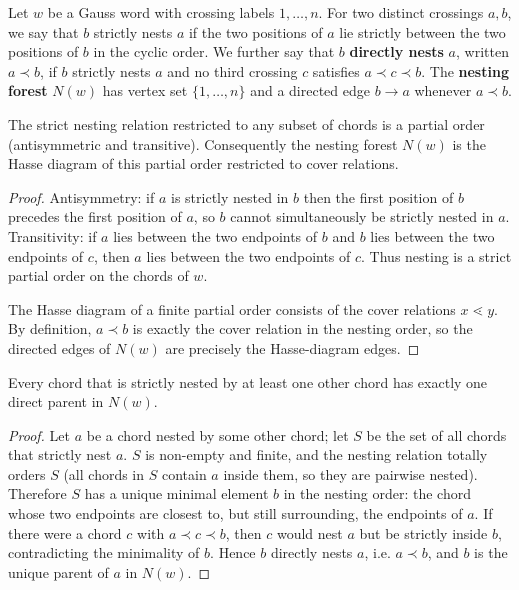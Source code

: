 
\begin{definition}\label{def:nesting-forest}
Let $w$ be a Gauss word with crossing labels $1,\dots,n$.
For two distinct crossings $a,b$, we say that $b$ strictly nests $a$
if the two positions of $a$ lie strictly between the two positions
of $b$ in the cyclic order.
We further say that $b$ \textbf{directly nests} $a$, written $a\prec b$,
if $b$ strictly nests $a$ and no third crossing $c$ satisfies
$a\prec c\prec b$.
The \textbf{nesting forest} $N(w)$ has vertex set $\{1,\dots,n\}$
and a directed edge $b\to a$ whenever $a\prec b$.
\end{definition}

\begin{lemma}\label{lem:D}
The strict nesting relation restricted to any subset of chords is a
partial order (antisymmetric and transitive).  Consequently the
nesting forest $N(w)$ is the Hasse diagram of this partial order
restricted to cover relations.
\end{lemma}

\begin{proof}
Antisymmetry: if $a$ is strictly nested in $b$ then the first position
of $b$ precedes the first position of $a$, so $b$ cannot simultaneously
be strictly nested in $a$.  Transitivity: if $a$ lies between the two
endpoints of $b$ and $b$ lies between the two endpoints of $c$, then
$a$ lies between the two endpoints of $c$.  Thus nesting is a strict
partial order on the chords of $w$.

The Hasse diagram of a finite partial order consists of the cover
relations $x\lessdot y$.  By definition, $a\prec b$ is exactly the
cover relation in the nesting order, so the directed edges of $N(w)$
are precisely the Hasse-diagram edges.
\end{proof}

\begin{lemma}\label{lem:E}
Every chord that is strictly nested by at least one other chord has
exactly one direct parent in $N(w)$.
\end{lemma}

\begin{proof}
Let $a$ be a chord nested by some other chord; let $S$ be the set of
all chords that strictly nest $a$.  $S$ is non-empty and finite, and
the nesting relation totally orders $S$ (all chords in $S$ contain $a$
inside them, so they are pairwise nested).  Therefore $S$ has a unique
minimal element $b$ in the nesting order: the chord whose two
endpoints are closest to, but still surrounding, the endpoints of $a$.
If there were a chord $c$ with $a\prec c\prec b$, then $c$ would nest
$a$ but be strictly inside $b$, contradicting the minimality of $b$.
Hence $b$ directly nests $a$, i.e.  $a\prec b$, and $b$ is the unique
parent of $a$ in $N(w)$.
\end{proof}
